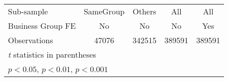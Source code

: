 {\begin{tabular}{l*{4}{c}}
\hline
Sub-sample      &SameGroup         &   Others         &      All         &      All         \\
Business Group FE&       No         &       No         &       No         &      Yes         \\
Observations    &    47076         &   342515         &   389591         &   389591         \\
\hline\hline
\multicolumn{5}{l}{\footnotesize \textit{t} statistics in parentheses}\\
\multicolumn{5}{l}{\footnotesize \sym{*} \(p<0.05\), \sym{**} \(p<0.01\), \sym{***} \(p<0.001\)}\\
\end{tabular}
}
